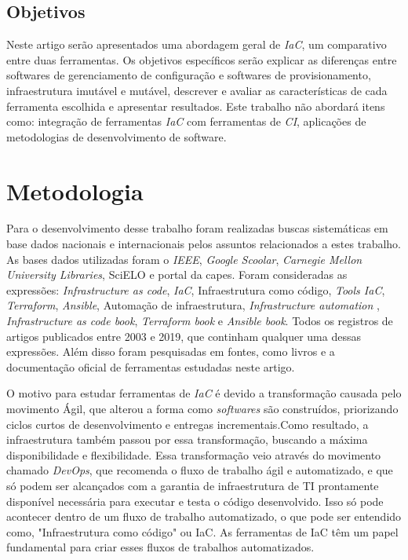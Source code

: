 \subsection{Objetivos}

Neste artigo serão apresentados uma abordagem geral de \textit{IaC}, um comparativo entre duas ferramentas. Os objetivos específicos serão explicar as diferenças entre softwares de gerenciamento de configuração e softwares de provisionamento, infraestrutura imutável e mutável, descrever e avaliar as características de cada ferramenta escolhida
e apresentar resultados. Este trabalho não abordará itens como: integração de ferramentas \textit{IaC}
com ferramentas de \textit{CI}, aplicações de metodologias de desenvolvimento de software.

\section{\esp Metodologia} \label{metodologia}

Para o desenvolvimento desse trabalho foram realizadas buscas sistemáticas em base  dados nacionais e internacionais pelos assuntos relacionados a estes trabalho. As bases dados utilizadas foram o \textit{IEEE}, \textit{Google Scoolar}, \textit{Carnegie Mellon University Libraries}, SciELO e portal da capes. Foram consideradas as expressões:  \textit{Infrastructure as code}, \textit{IaC}, Infraestrutura como código, \textit{Tools IaC}, \textit{Terraform}, \textit{Ansible}, Automação de infraestrutura, \textit{Infrastructure automation} , \textit{Infrastructure as code book}, \textit{Terraform book} e \textit{Ansible book}. Todos os registros de artigos publicados entre 2003 e 2019, que continham qualquer uma dessas expressões. Além disso foram pesquisadas em fontes, como livros e a documentação oficial de ferramentas estudadas neste artigo.

O motivo para estudar ferramentas de \textit{IaC} é devido a transformação causada pelo movimento Ágil, que alterou a forma como \textit{softwares} são construídos, priorizando ciclos curtos de desenvolvimento e entregas incrementais.Como resultado, a infraestrutura também passou por essa transformação, buscando a máxima disponibilidade e flexibilidade. Essa transformação veio através do movimento chamado \textit{DevOps}, que recomenda o fluxo de trabalho ágil e automatizado, e que só podem ser alcançados com a garantia de infraestrutura de TI prontamente disponível necessária para executar e testa o código desenvolvido. Isso só pode acontecer dentro de um fluxo de trabalho automatizado, o que pode ser entendido como, "Infraestrutura como código" ou IaC. As ferramentas de IaC têm um papel fundamental para criar esses fluxos de trabalhos automatizados.

